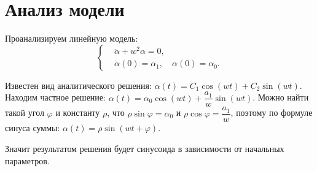 \section{Анализ модели}
    Проанализируем линейную модель:
    \[
        \begin{cases}
            & \ddot{\alpha} + w^2 \alpha = 0, \\
            & \dot{\alpha}(0) = \alpha_1, \quad \alpha(0) = \alpha_0.
        \end{cases}
    \]

    Известен вид аналитического решения: \( \alpha(t) = C_1 \cos(wt) + C_2 \sin(wt) \). Находим частное решение: \( \alpha(t) = \alpha_0 \cos(wt) + \dfrac{a_1}{w} \sin(wt) \). Можно найти такой угол $\varphi$ и константу $\rho$, что \( \rho\sin \varphi = \alpha_0 \) и \( \rho\cos \varphi = \dfrac{a_1}{w} \), поэтому по формуле синуса суммы: \( \alpha(t) = \rho\sin(wt + \varphi) \).

    Значит результатом решения будет синусоида в зависимости от начальных параметров.